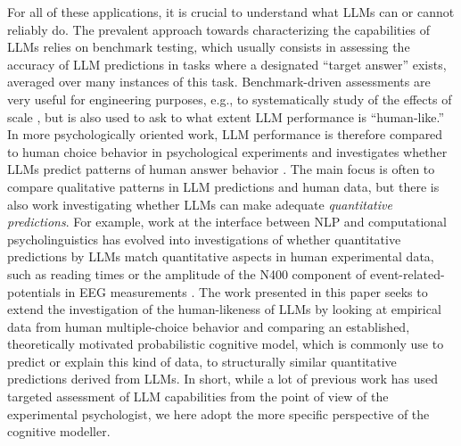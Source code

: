 \documentclass[fleqn]{article}
\begin{document}
For all of these applications, it is crucial to understand what LLMs can or cannot reliably do.
The prevalent approach towards characterizing the capabilities of LLMs relies on benchmark testing, which usually consists in assessing the accuracy of LLM predictions in tasks where a designated ``target answer'' exists, averaged over many instances of this task.
Benchmark-driven assessments are very useful for engineering purposes, e.g., to systematically study of the effects of scale \citep[e.g.,][]{srivastava2023-BIGbench}, but is also used to ask to what extent LLM performance is ``human-like.''
In more psychologically oriented work, LLM performance is therefore compared to human choice behavior in psychological experiments and investigates whether LLMs predict patterns of human answer behavior  \citep[e.g.,][]{BinzSchulz2023:Using-cognitive,Hagendorff2023:Machine-Psychol,ShiffrinMitchell2023:Probing-the-psy}.
The main focus is often to compare qualitative patterns in LLM predictions and human data, but there is also work investigating whether LLMs can make adequate \emph{quantitative predictions}.
For example, work at the interface between NLP and computational psycholinguistics \citep{MarvinLinzen2018:Targeted-Syntac,HuGauthier2020:A-Systematic-As} has evolved into investigations of whether quantitative predictions by LLMs match quantitative aspects in human experimental data, such as reading times \citep{WilcoxVani2021:A-Targeted-Asse} or the amplitude of the N400 component of event-related-potentials in EEG measurements \citep{LindborgRabovsky2021:Meaning-in-brai}.
The work presented in this paper seeks to extend the investigation of the human-likeness of LLMs by looking at empirical data from human multiple-choice behavior and comparing an established, theoretically motivated probabilistic cognitive model, which is commonly use to predict or explain this kind of data, to structurally similar quantitative predictions derived from LLMs.
In short, while a lot of previous work has used targeted assessment of LLM capabilities from the point of view of the experimental psychologist, we here adopt the more specific perspective of the cognitive modeller.
\end{document}
